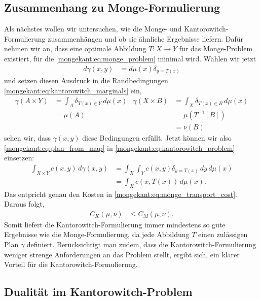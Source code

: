 \subsection{Zusammenhang zu Monge-Formulierung%
\label{mongekant:subsection:monge_kantorowitch_connection}}
Als nächstes wollen wir untersuchen,
wie die Monge- und Kantorowitch-Formulierung zusammenhängen und
ob sie ähnliche Ergebnisse liefern.
Dafür nehmen wir an,
dass eine optimale Abbildung $T\colon X \to Y$ für das Monge-Problem existiert,
für die \eqref{mongekant:eq:monge_problem} minimal wird.
Wählen wir jetzt
\begin{align}
d\gamma(x,y)
&=
d\mu(x) \delta_{y=T(x)}
\label{mongekant:eq:plan_from_map}
\end{align}
und setzen diesen Ausdruck
in die Randbedingungen \eqref{mongekant:eq:kantorowitch_marginals} ein,
\begin{align*}
\gamma(A \times Y)
&=
\int_A \delta_{T(x) \in Y}\, d\mu(x)
&
\gamma(X \times B)
&=
\int_X \delta_{T(x) \in B}\, d\mu(x)
\\
&=
\mu(A)
&&=
\mu\left(T^{-1}[B]\right)
\\
&&&=
\nu(B)
\end{align*}
sehen wir,
dass $\gamma(x,y)$ diese Bedingungen erfüllt.
Jetzt können wir also \eqref{mongekant:eq:plan_from_map} in
\eqref{mongekant:eq:kantorowitch_problem} einsetzen:
\begin{align*}
\int_{X \times Y} c(x,y)\, d\gamma(x,y)
&=
\int_X \int_Y c(x,y) \delta_{y=T(x)}\, dy\, d\mu(x)
\\
&=
\int_X c(x, T(x))\, d\mu(x)
.
\end{align*}
Das entpricht genau den Kosten in \eqref{mongekant:eq:monge_transport_cost}.
Daraus folgt,
\begin{align*}
C_K(\mu, \nu)
&\leq
C_M(\mu, \nu)
.
\end{align*}
Somit liefert die Kantorowitch-Formulierung immer mindestens so gute Ergebnisse
wie die Monge-Formulierung,
da jede Abbildung $T$ einen zulässigen Plan $\gamma$ definiert.
Berücksichtigt man zudem,
dass die Kantorowitch-Formulierung weniger strenge Anforderungen an das Problem stellt,
ergibt sich,
ein klarer Vorteil für die Kantorowitch-Formulierung.

\subsection{Dualität im Kantorowitch-Problem%
\label{mongekant:subsection:kantorowitch_duality}}

